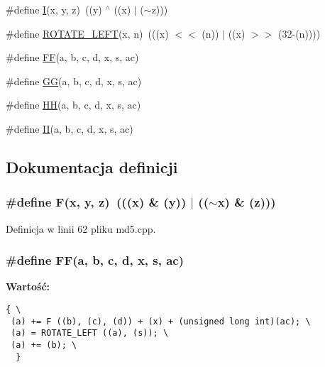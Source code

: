 \begin{CompactItemize}
\#define \hyperlink{a00009_c0eafdc9ee161b71e7af98af736952fd}{I}(x, y, z)~((y) $^\wedge$ ((x) $|$ ($\sim$z)))
\item 
\#define \hyperlink{a00009_7417fd4e875360c0533fa5b412cdab49}{ROTATE\_\-LEFT}(x, n)~(((x) $<$$<$ (n)) $|$ ((x) $>$$>$ (32-(n))))
\item 
\#define \hyperlink{a00009_0a143972cb6c4fe16f0ffa8a3d41ebf3}{FF}(a, b, c, d, x, s, ac)
\item 
\#define \hyperlink{a00009_685f32faa2a66e743850b990a13b8bfa}{GG}(a, b, c, d, x, s, ac)
\item 
\#define \hyperlink{a00009_8b9f1c4778df01ef970b87dbe5541dc5}{HH}(a, b, c, d, x, s, ac)
\item 
\#define \hyperlink{a00009_d26626e5efb37b2dadef4e88e35e4329}{II}(a, b, c, d, x, s, ac)
\end{CompactItemize}


\subsection{Dokumentacja definicji}
\hypertarget{a00009_96d73bbd7af15cb1fc38c3f4a3bd82e9}{
\subsubsection[{F}]{\setlength{\rightskip}{0pt plus 5cm}\#define F(x, \/  y, \/  z)~(((x) \& (y)) $|$ (($\sim$x) \& (z)))}}
\label{a00009_96d73bbd7af15cb1fc38c3f4a3bd82e9}




Definicja w linii 62 pliku md5.cpp.\hypertarget{a00009_0a143972cb6c4fe16f0ffa8a3d41ebf3}{
\subsubsection[{FF}]{\setlength{\rightskip}{0pt plus 5cm}\#define FF(a, \/  b, \/  c, \/  d, \/  x, \/  s, \/  ac)}}
\label{a00009_0a143972cb6c4fe16f0ffa8a3d41ebf3}


\textbf{Wartość:}

\begin{Code}\begin{verbatim}{ \
 (a) += F ((b), (c), (d)) + (x) + (unsigned long int)(ac); \
 (a) = ROTATE_LEFT ((a), (s)); \
 (a) += (b); \
  }
\end{verbatim}
\end{Code}


